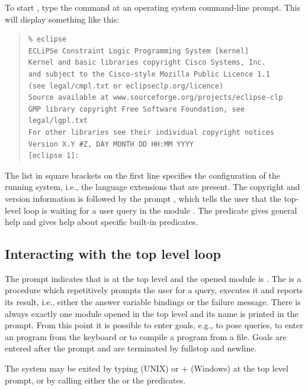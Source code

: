 To start {\eclipse}, type the command  at an
operating system command-line prompt.
This will display something like this:
\begin{quote}
\begin{verbatim}
% eclipse
ECLiPSe Constraint Logic Programming System [kernel]
Kernel and basic libraries copyright Cisco Systems, Inc.
and subject to the Cisco-style Mozilla Public Licence 1.1
(see legal/cmpl.txt or eclipseclp.org/licence)
Source available at www.sourceforge.org/projects/eclipse-clp
GMP library copyright Free Software Foundation, see legal/lgpl.txt
For other libraries see their individual copyright notices
Version X.Y #Z, DAY MONTH DD HH:MM YYYY
[eclipse 1]:
\end{verbatim}
\end{quote}
The list in square brackets on the first line specifies the configuration
of the running system, i.e., the language extensions that are present.
The copyright and version information is followed by the prompt
\notation{[eclipse 1]:}, which tells the user that the top-level loop is waiting
for a user query in the module .
The predicate  gives
general help and  gives
help about specific built-in predicates.

\subsection{Interacting with the top level loop}

The {\eclipse} prompt \notation{[eclipse 1]:} indicates that {\eclipse}
is at the top level
and the opened module is .
The  is a procedure which repetitively
prompts the user for a query, executes it and reports its
result, i.e., either the answer variable bindings or the
failure message.
There is always exactly one module opened in the top level
and its name is printed in the prompt.
From this point it is possible to enter {\eclipse} goals, e.g., to
pose queries, to enter an {\eclipse} program from the keyboard
or to compile a program from a file.
Goals are entered after the prompt and are terminated by fullstop and
newline.

The {\eclipse} system may be exited by typing  (UNIX) or
 +  (Windows) at the top level prompt,
or by calling either the 
or the  predicates.


